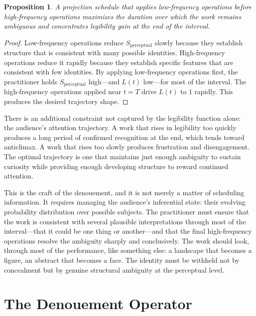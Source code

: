 \documentclass[12pt, twoside]{article}
\theoremstyle{plain}
\newtheorem{proposition}[theorem]{Proposition}
\theoremstyle{definition}
\theoremstyle{remark}
\begin{document}
\begin{proposition}
\label{prop:frequency-ordering}
A projection schedule that applies low-frequency operations before high-frequency operations maximizes the duration over which the work remains ambiguous and concentrates legibility gain at the end of the interval.
\end{proposition}

\begin{proof}
Low-frequency operations reduce $S_{\text{perceptual}}$ slowly because they establish structure that is consistent with many possible identities. High-frequency operations reduce it rapidly because they establish specific features that are consistent with few identities. By applying low-frequency operations first, the practitioner holds $S_{\text{perceptual}}$ high---and $L(t)$ low---for most of the interval. The high-frequency operations applied near $t = T$ drive $L(t)$ to $1$ rapidly. This produces the desired trajectory shape.
\end{proof}

There is an additional constraint not captured by the legibility function alone: the audience's attention trajectory. A work that rises in legibility too quickly produces a long period of confirmed recognition at the end, which tends toward anticlimax. A work that rises too slowly produces frustration and disengagement. The optimal trajectory is one that maintains just enough ambiguity to sustain curiosity while providing enough developing structure to reward continued attention.

This is the craft of the denouement, and it is not merely a matter of scheduling information. It requires managing the audience's inferential state: their evolving probability distribution over possible subjects. The practitioner must ensure that the work is consistent with several plausible interpretations through most of the interval---that it could be one thing or another---and that the final high-frequency operations resolve the ambiguity sharply and conclusively. The work should look, through most of the performance, like something else: a landscape that becomes a figure, an abstract that becomes a face. The identity must be withheld not by concealment but by genuine structural ambiguity at the perceptual level.

\section{The Denouement Operator}
\label{sec:denouement}
\end{document}
